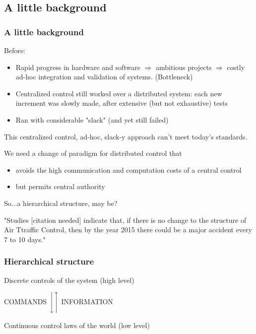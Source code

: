 \documentclass{beamer}
\begin{document}
\subsection{A little background}
\begin{frame}

\frametitle{A little background}

Before:
\begin{itemize}
	\item Rapid progress in hardware and software $\Rightarrow$ 
ambitious projects $\Rightarrow$ costly ad-hoc integration and validation of systems. (Bottleneck)
	\item Centralized control still worked over a distributed system: each new increment was slowly made, after extensive (but not exhaustive) tests
	\item Ran with considerable "slack" (and yet still failed)
\end{itemize}

This centralized control, ad-hoc, slack-y approach can't meet today's standards.

We need a change of paradigm for distributed control that
\begin{itemize}
	\item avoids the high communication and computation costs of a central control
	\item but permits central authority
\end{itemize}

So...a hierarchical structure, may be? \newline


\tiny{"Studies [citation needed] indicate that, if there is no change to the structure of Air Ttraffic Control, then by the year 2015 there could be a major accident every 7 to 10 days."}
\end{frame}


\begin{frame}
	\frametitle{Hierarchical structure}

	\centerline{Discrete controls of the system (high level) }
	\centerline{COMMANDS $\Bigg\downarrow\Bigg\uparrow$ INFORMATION}
	
	\centerline{Continuous control laws of the world (low level)}
\end{frame}


%
\end{document}
